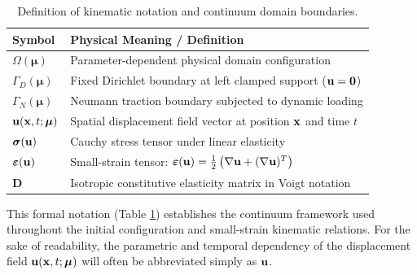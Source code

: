 \begin{table}[htbp]
    \centering
    \caption{Definition of kinematic notation and continuum domain boundaries.}
    \label{tab:kinematic_notation}
    \begin{tabular}{l p{10.5cm}}
        \toprule
        \textbf{Symbol}                           & \textbf{Physical Meaning / Definition}                                                                                  \\
        \midrule
        $\Omega(\boldsymbol{\mu})$                & Parameter-dependent physical domain configuration                                                                       \\
        $\Gamma_D(\boldsymbol{\mu})$              & Fixed Dirichlet boundary at left clamped support ($\mathbf{u} = \mathbf{0}$)                                                \\
        $\Gamma_N(\boldsymbol{\mu})$              & Neumann traction boundary subjected to dynamic loading                                                                  \\
        $\mathbf{u}(\mathbf{x}, t; \boldsymbol{\mu})$ & Spatial displacement field vector at position $\mathbf{x}$ and time $t$                                                   \\
        $\boldsymbol{\sigma}(\mathbf{u})$           & Cauchy stress tensor under linear elasticity                                                                            \\
        $\boldsymbol{\varepsilon}(\mathbf{u})$      & Small-strain tensor: $\boldsymbol{\varepsilon}(\mathbf{u}) = \frac{1}{2}\left(\nabla\mathbf{u} + (\nabla\mathbf{u})^T\right)$ \\
        $\mathbf{D}$                              & Isotropic constitutive elasticity matrix in Voigt notation                                                              \\
        \bottomrule
    \end{tabular}
\end{table}

This formal notation (Table \ref{tab:kinematic_notation}) establishes the continuum framework used throughout the initial configuration and small-strain kinematic relations. For the sake of readability, the parametric and temporal dependency of the displacement field $\mathbf{u}(\mathbf{x}, t; \boldsymbol{\mu})$ will often be abbreviated simply as $\mathbf{u}$.

